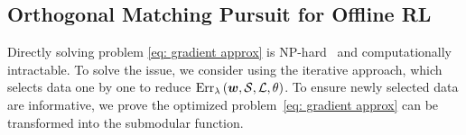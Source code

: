 





\subsection{Orthogonal Matching Pursuit for Offline RL}\label{sec: offline omp}
Directly solving problem \ref{eq: gradient approx} is NP-hard~\citep{killamsetty2021glister,killamsetty2021retrieve} and computationally intractable.
To solve the issue, we consider using the iterative approach, which selects data one by one to reduce $\operatorname{Err}_{\lambda}\left({\bm{w}}, \mathcal{S}, \mathcal L, \theta\right)$.
To ensure newly selected data are informative, we prove the optimized problem~\ref{eq: gradient approx} can be transformed into the submodular function.

